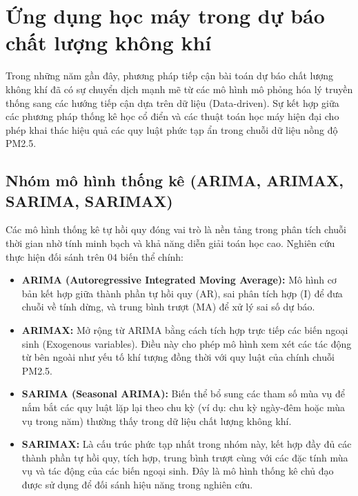 \section{Ứng dụng học máy trong dự báo chất lượng không khí}
Trong những năm gần đây, phương pháp tiếp cận bài toán dự báo chất lượng không khí đã có sự chuyển dịch mạnh mẽ từ các mô hình mô phỏng hóa lý truyền thống sang các hướng tiếp cận dựa trên dữ liệu (Data-driven). Sự kết hợp giữa các phương pháp thống kê học cổ điển và các thuật toán học máy hiện đại cho phép khai thác hiệu quả các quy luật phức tạp ẩn trong chuỗi dữ liệu nồng độ PM2.5.
\subsection{Nhóm mô hình thống kê (ARIMA, ARIMAX, SARIMA, SARIMAX)}
Các mô hình thống kê tự hồi quy đóng vai trò là nền tảng trong phân tích chuỗi thời gian nhờ tính minh bạch và khả năng diễn giải toán học cao. Nghiên cứu thực hiện đối sánh trên 04 biến thể chính:
\begin{itemize}
    \item \textbf{ARIMA (Autoregressive Integrated Moving Average):} Mô hình cơ bản kết hợp giữa thành phần tự hồi quy (AR), sai phân tích hợp (I) để đưa chuỗi về tính dừng, và trung bình trượt (MA) để xử lý sai số dự báo.
    \item \textbf{ARIMAX:} Mở rộng từ ARIMA bằng cách tích hợp trực tiếp các biến ngoại sinh (Exogenous variables). Điều này cho phép mô hình xem xét các tác động từ bên ngoài như yếu tố khí tượng đồng thời với quy luật của chính chuỗi PM2.5.
    \item \textbf{SARIMA (Seasonal ARIMA):} Biến thể bổ sung các tham số mùa vụ để nắm bắt các quy luật lặp lại theo chu kỳ (ví dụ: chu kỳ ngày-đêm hoặc mùa vụ trong năm) thường thấy trong dữ liệu chất lượng không khí.
    \item \textbf{SARIMAX:} Là cấu trúc phức tạp nhất trong nhóm này, kết hợp đầy đủ các thành phần tự hồi quy, tích hợp, trung bình trượt cùng với các đặc tính mùa vụ và tác động của các biến ngoại sinh. Đây là mô hình thống kê chủ đạo được sử dụng để đối sánh hiệu năng trong nghiên cứu.
\end{itemize}
